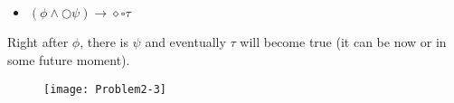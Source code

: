 \subsection{}

\begin{itemize}
   \item[] $(\phi \land \bigcirc \psi) \rightarrow \diamond \square \tau$ 
\end{itemize}

\indent Right after $\phi$, there is $\psi$ and eventually $\tau$ will become true (it can be now or in some future moment).

\begin{figure}[h!]
	\centering \texttt{[image: Problem2-3]}
\end{figure}